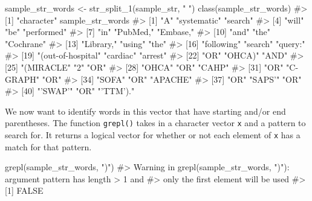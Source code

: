 \documentclass[
  letterpaper,
]{krantz}
\makeatletter
\newenvironment{Shaded}{\begin{snugshade}}{\end{snugshade}}
\newcommand{\CommentTok}[1]{\textcolor[rgb]{0.37,0.37,0.37}{#1}}
\newcommand{\FunctionTok}[1]{\textcolor[rgb]{0.28,0.35,0.67}{#1}}
\newcommand{\NormalTok}[1]{\textcolor[rgb]{0.00,0.23,0.31}{#1}}
\newcommand{\OtherTok}[1]{\textcolor[rgb]{0.00,0.23,0.31}{#1}}
\newcommand{\StringTok}[1]{\textcolor[rgb]{0.13,0.47,0.30}{#1}}
\newenvironment{kframe}{%
\medskip{}
\setlength{\fboxsep}{.8em}
 \def\at@end@of@kframe{}%
 \ifinner\ifhmode%
  \def\at@end@of@kframe{\end{minipage}}%
  \begin{minipage}{\columnwidth}%
 \fi\fi%
 \def\FrameCommand##1{\hskip\@totalleftmargin \hskip-\fboxsep
 \colorbox{shadecolor}{##1}\hskip-\fboxsep
     \hskip-\linewidth \hskip-\@totalleftmargin \hskip\columnwidth}%
 \MakeFramed {\advance\hsize-\width
   \@totalleftmargin\z@ \linewidth\hsize
   \@setminipage}}%
 {\par\unskip\endMakeFramed%
 \at@end@of@kframe}
\renewenvironment{Shaded}{\begin{kframe}}{\end{kframe}}
\makeatother
\begin{document}
\begin{Shaded}
\begin{Highlighting}[]
\NormalTok{sample\_str\_words }\OtherTok{\textless{}{-}} \FunctionTok{str\_split\_1}\NormalTok{(sample\_str, }\StringTok{" "}\NormalTok{)}
\FunctionTok{class}\NormalTok{(sample\_str\_words)}
\CommentTok{\#\textgreater{} [1] "character"}
\NormalTok{sample\_str\_words}
\CommentTok{\#\textgreater{}  [1] "A"                 "systematic"        "search"           }
\CommentTok{\#\textgreater{}  [4] "will"              "be"                "performed"        }
\CommentTok{\#\textgreater{}  [7] "in"                "PubMed,"           "Embase,"          }
\CommentTok{\#\textgreater{} [10] "and"               "the"               "Cochrane"         }
\CommentTok{\#\textgreater{} [13] "Library,"          "using"             "the"              }
\CommentTok{\#\textgreater{} [16] "following"         "search"            "query:"           }
\CommentTok{\#\textgreater{} [19] "(\textquotesingle{}out{-}of{-}hospital" "cardiac"           "arrest\textquotesingle{}"          }
\CommentTok{\#\textgreater{} [22] "OR"                "\textquotesingle{}OHCA\textquotesingle{})"           "AND"              }
\CommentTok{\#\textgreater{} [25] "(\textquotesingle{}MIRACLE"         "2\textquotesingle{}"                "OR"               }
\CommentTok{\#\textgreater{} [28] "\textquotesingle{}OHCA\textquotesingle{}"            "OR"                "\textquotesingle{}CAHP\textquotesingle{}"           }
\CommentTok{\#\textgreater{} [31] "OR"                "\textquotesingle{}C{-}GRAPH\textquotesingle{}"         "OR"               }
\CommentTok{\#\textgreater{} [34] "\textquotesingle{}SOFA\textquotesingle{}"            "OR"                "\textquotesingle{}APACHE\textquotesingle{}"         }
\CommentTok{\#\textgreater{} [37] "OR"                "\textquotesingle{}SAPS’"            "OR"               }
\CommentTok{\#\textgreater{} [40] "’SWAP’"            "OR"                "’TTM’)."}
\end{Highlighting}
\end{Shaded}

We now want to identify words in this vector that have starting and/or
end parentheses. The function \texttt{grepl()} takes in a character
vector \texttt{x} and a pattern to search for. It returns a logical
vector for whether or not each element of \texttt{x} has a match for
that pattern.

\begin{Shaded}
\begin{Highlighting}[]
\FunctionTok{grepl}\NormalTok{(sample\_str\_words, }\StringTok{")"}\NormalTok{)}
\CommentTok{\#\textgreater{} Warning in grepl(sample\_str\_words, ")"): argument \textquotesingle{}pattern\textquotesingle{} has length \textgreater{} 1 and}
\CommentTok{\#\textgreater{} only the first element will be used}
\CommentTok{\#\textgreater{} [1] FALSE}
\end{Highlighting}
\end{Shaded}
\end{document}
